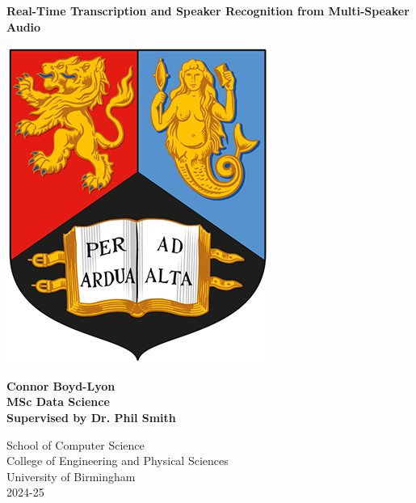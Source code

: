
\thispagestyle{empty}

\begin{spacing}{2}
	\begin{center}
		\textbf{\Huge Real-Time Transcription and Speaker Recognition from Multi-Speaker Audio}
	\end{center}
	\vspace{5mm}
	\begin{center}
		\includegraphics[scale = 1.75]{Preamble/BirmCrest.png}
	\end{center}
	\vspace{5mm}
	\begin{center}
		\textbf{\LARGE Connor Boyd-Lyon}
		\vspace{15mm}
		\\\textbf{\Large MSc Data Science}
		\\\textbf{\Large Supervised by Dr. Phil Smith}
		\vspace{20mm}
	\end{center}
	\begin{center}
		{\Large School of Computer Science}
		\\ {\Large College of Engineering and Physical Sciences}
		\\ {\Large University of Birmingham}
		\\ {\Large 2024-25}
	\end{center}
\end{spacing}


